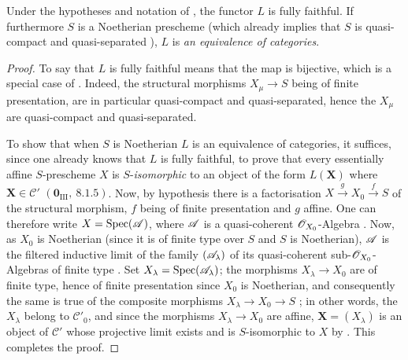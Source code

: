 \begin{proposition}[8.13.5]
\label{IV.8.13.5}
Under the hypotheses and notation of , the functor $L$ is fully faithful.
If furthermore $S$ is a Noetherian prescheme (which already implies that $S$ is quasi-compact and quasi-separated ), $L$ is \emph{an equivalence of categories}.
\end{proposition}

\begin{proof}
To say that $L$ is fully faithful means that the map  is bijective, which is a special case of .
Indeed, the structural morphisms $X_\mu\to S$ being of finite presentation, are in particular quasi-compact and quasi-separated, hence the $X_\mu$ are quasi-compact and quasi-separated.

To show that when $S$ is Noetherian $L$ is an equivalence of categories, it suffices, since one already knows that $L$ is fully faithful, to prove that every essentially affine $S$-prescheme $X$ is $S$-\emph{isomorphic} to an object of the form $L(\mathbf{X})$ where $\mathbf{X}\in\mathcal{C}'$ $(\mathbf{0}_{\text{III}},~8.1.5)$.
Now, by hypothesis there is a factorisation $X\xrightarrow{g}X_0\xrightarrow{f}S$ of the structural morphism, $f$ being of finite presentation and $g$ affine.
One can therefore write $X=\operatorname{Spec}(\mathscr{A})$, where $\mathscr{A}$ is a quasi-coherent $\mathscr{O}_{X_0}$-Algebra .
Now, as $X_0$ is Noetherian (since it is of finite type over $S$ and $S$ is Noetherian), $\mathscr{A}$ is the filtered inductive limit of the family $(\mathscr{A}_\lambda)$ of its quasi-coherent sub-$\mathscr{O}_{X_0}$-Algebras of finite type .
Set $X_\lambda=\operatorname{Spec}(\mathscr{A}_\lambda)$; the morphisms $X_\lambda\to X_0$ are of finite type, hence of finite presentation since $X_0$ is Noetherian, and consequently the same is true of the composite morphisms $X_\lambda\to X_0\to S$ ; in other words, the $X_\lambda$ belong to $\mathcal{C}'_0$, and since the morphisms $X_\lambda\to X_0$ are affine, $\mathbf{X}=(X_\lambda)$ is an object of $\mathcal{C}'$ whose projective limit exists and is $S$-isomorphic to $X$ by .
This completes the proof.
\end{proof}

